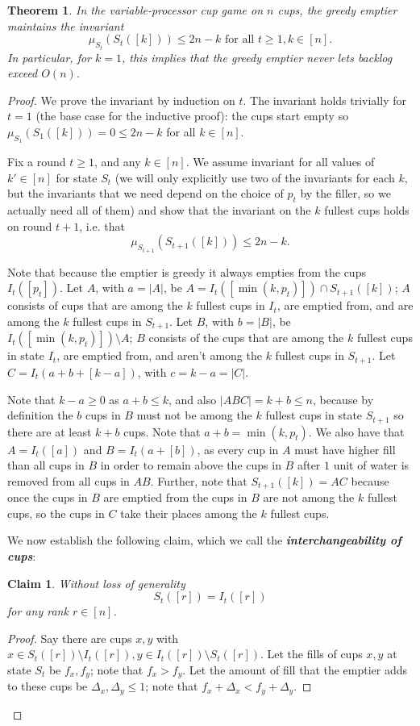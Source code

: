 \documentclass[twocolumn]{article}[10pt]
\newcommand{\defn}[1]{{\textit{\textbf{\boldmath #1}}}\xspace}
\newtheorem{clm}{Claim}
\newtheorem{theorem}{Theorem}
\begin{document}
\begin{theorem}
  \label{thm:invariant}
  In the variable-processor cup game on $n$ cups, the greedy emptier maintains
  the invariant $$\mu_{S_t}(S_t([k])) \le 2n-k \text{ for all } t\ge 1, k \in
  [n].$$ In particular, for $k=1$, this implies that the greedy emptier never
  lets backlog exceed $O(n)$.
\end{theorem}
\begin{proof}

We prove the invariant by induction on $t$.
The invariant holds trivially for $t=1$ (the base case for the inductive proof): 
the cups start empty so $\mu_{S_1}(S_1([k])) = 0 \le 2n-k$ for all $k \in [n]$.

Fix a round $t \ge 1$, and any $k \in [n]$. We assume invariant for all
values of $k' \in[n]$ for state $S_t$ (we will only explicitly use two of the
invariants for each $k$, but the invariants that we need depend on the
choice of $p_t$ by the filler, so we actually need all of them) and show that
the invariant on the $k$ fullest cups holds on round $t+1$, i.e. that
$$\mu_{S_{t+1}}(S_{t+1}([k])) \le 2n-k.$$

Note that because the emptier is greedy it always empties from the cups $I_t([p_t])$.
Let $A$, with $a=|A|$, be $A = I_t([\min(k, p_t)]) \cap S_{t+1}([k])$; $A$
consists of cups that are among the $k$ fullest cups in $I_t$, are emptied from, and
are among the $k$ fullest cups in $S_{t+1}$.
Let $B$, with $b=|B|$, be $I_t([\min(k, p_t)]) \setminus A$; $B$ consists of
the cups that are among the $k$ fullest cups in state $I_t$, are emptied from,
and aren't among the $k$ fullest cups in $S_{t+1}$. 
Let $C = I_t(a+b+[k-a])$, with $c=k-a = |C|$.

Note that $k-a\ge 0$ as $a+b \le k$, and also $|ABC| = k+b \le n$, because by
definition the $b$ cups in $B$ must not be among the $k$ fullest cups in state
$S_{t+1}$ so there are at least $k+b$ cups. 
Note that $a+ b = \min(k, p_t)$. We also have that $A = I_t([a])$ and $B =
I_t(a+[b])$, as every cup in $A$ must have higher fill than all cups in $B$ in
order to remain above the cups in $B$ after $1$ unit of water is removed from
all cups in $AB$.
Further, note that $S_{t+1}([k]) = AC$ because once the cups in $B$
are emptied from the cups in $B$ are not among the $k$ fullest cups, so the
cups in $C$ take their places among the $k$ fullest cups.

We now establish the following claim, which we call the \defn{interchangeability of cups}:
\begin{clm}
  \label{clm:interchangable}
  Without loss of generality $$S_t([r]) = I_t([r])$$ for any rank $r \in [n]$.
\end{clm}
\begin{proof}
  Say there are cups $x, y$ with $x\in S_t([r]) \setminus I_t([r]), y \in
  I_t([r])\setminus S_t([r])$. Let the fills of cups $x,y$ at state $S_t$
  be $f_x, f_y$; note that $f_x > f_y$. Let the amount of fill that the emptier
  adds to these cups be $\Delta_x, \Delta_y \le 1$; note that $f_x +\Delta_x <
  f_y + \Delta_y$.


\end{proof}
\end{proof}
\end{document}
